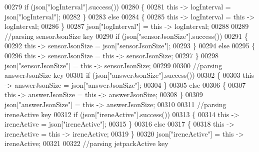 \begin{DoxyCode}
00279             \textcolor{keywordflow}{if} (json[\textcolor{stringliteral}{"logInterval"}].success())
00280             \{
00281                 \textcolor{keyword}{this} -> logInterval = json[\textcolor{stringliteral}{"logInterval"}];
00282             \}
00283             \textcolor{keywordflow}{else}
00284             \{
00285                 \textcolor{keyword}{this} -> logInterval = \textcolor{keyword}{this} -> logInterval;
00286             \}
00287             json[\textcolor{stringliteral}{"logInterval"}] = \textcolor{keyword}{this} -> logInterval;
00288 
00289             \textcolor{comment}{//parsing sensorJsonSize key}
00290             \textcolor{keywordflow}{if} (json[\textcolor{stringliteral}{"sensorJsonSize"}].success())
00291             \{
00292                 \textcolor{keyword}{this} -> sensorJsonSize = json[\textcolor{stringliteral}{"sensorJsonSize"}];
00293             \}
00294             \textcolor{keywordflow}{else}
00295             \{
00296                 \textcolor{keyword}{this} -> sensorJsonSize = \textcolor{keyword}{this} -> sensorJsonSize;
00297             \}
00298             json[\textcolor{stringliteral}{"sensorJsonSize"}] = \textcolor{keyword}{this} -> sensorJsonSize;
00299             
00300             \textcolor{comment}{//parsing answerJsonSize key            }
00301             \textcolor{keywordflow}{if} (json[\textcolor{stringliteral}{"answerJsonSize"}].success())
00302             \{
00303                 \textcolor{keyword}{this} -> answerJsonSize = json[\textcolor{stringliteral}{"answerJsonSize"}];
00304             \}
00305             \textcolor{keywordflow}{else}
00306             \{
00307                 \textcolor{keyword}{this} -> answerJsonSize = \textcolor{keyword}{this} -> answerJsonSize;
00308             \}
00309             json[\textcolor{stringliteral}{"answerJsonSize"}] = \textcolor{keyword}{this} -> answerJsonSize;
00310             
00311             \textcolor{comment}{//parsing ireneActive key           }
00312             \textcolor{keywordflow}{if} (json[\textcolor{stringliteral}{"ireneActive"}].success())
00313             \{
00314                 \textcolor{keyword}{this} -> ireneActive = json[\textcolor{stringliteral}{"ireneActive"}];
00315             \}
00316             \textcolor{keywordflow}{else}
00317             \{
00318                 \textcolor{keyword}{this} -> ireneActive = \textcolor{keyword}{this} -> ireneActive;
00319             \}
00320             json[\textcolor{stringliteral}{"ireneActive"}] = \textcolor{keyword}{this} -> ireneActive;
00321             
00322             \textcolor{comment}{//parsing jetpackActive key}

\end{DoxyCode}
